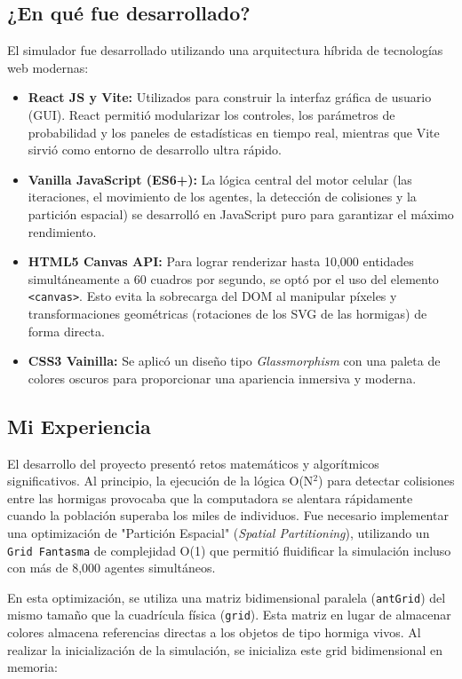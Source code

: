 \documentclass[12pt,a4paper]{article}
\begin{document}
\subsection{¿En qué fue desarrollado?}
El simulador fue desarrollado utilizando una arquitectura híbrida de tecnologías web modernas:
\begin{itemize}
    \item \textbf{React JS y Vite:} Utilizados para construir la interfaz gráfica de usuario (GUI). React permitió modularizar los controles, los parámetros de probabilidad y los paneles de estadísticas en tiempo real, mientras que Vite sirvió como entorno de desarrollo ultra rápido.
    \item \textbf{Vanilla JavaScript (ES6+):} La lógica central del motor celular (las iteraciones, el movimiento de los agentes, la detección de colisiones y la partición espacial) se desarrolló en JavaScript puro para garantizar el máximo rendimiento.
    \item \textbf{HTML5 Canvas API:} Para lograr renderizar hasta 10,000 entidades simultáneamente a 60 cuadros por segundo, se optó por el uso del elemento \texttt{<canvas>}. Esto evita la sobrecarga del DOM al manipular píxeles y transformaciones geométricas (rotaciones de los SVG de las hormigas) de forma directa.
    \item \textbf{CSS3 Vainilla:} Se aplicó un diseño tipo \textit{Glassmorphism} con una paleta de colores oscuros para proporcionar una apariencia inmersiva y moderna.
\end{itemize}

\subsection{Mi Experiencia}
El desarrollo del proyecto presentó retos matemáticos y algorítmicos significativos. Al principio, la ejecución de la lógica O(N$^2$) para detectar colisiones entre las hormigas provocaba que la computadora se alentara rápidamente cuando la población superaba los miles de individuos. Fue necesario implementar una optimización de "Partición Espacial" (\textit{Spatial Partitioning}), utilizando un \texttt{Grid Fantasma} de complejidad O(1) que permitió fluidificar la simulación incluso con más de 8,000 agentes simultáneos.

En esta optimización, se utiliza una matriz bidimensional paralela (\texttt{antGrid}) del mismo tamaño que la cuadrícula física (\texttt{grid}). Esta matriz en lugar de almacenar colores almacena referencias directas a los objetos de tipo hormiga vivos. Al realizar la inicialización de la simulación, se inicializa este grid bidimensional en memoria:
\end{document}
